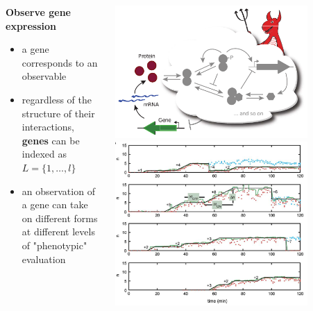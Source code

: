 \begin{frame}
\begin{columns}[c]
\begin{column}{0.5\textwidth}
\begin{block}{\textbf{Observe gene expression}}
\begin{itemize}
\item a gene corresponds to an observable
\item regardless of the structure of their interactions, \textbf{genes} can be indexed as $L = \{1, \ldots, l \}$
\item an observation of a gene can take on different forms at different levels of "phenotypic" evaluation
\end{itemize}
\end{block}
\end{column}
\begin{column}{0.5\textwidth}
\begin{center}
\includegraphics[width=0.8\textwidth]{fig/geneexpressiondemon.pdf}
\cite{Lestas2010}
\includegraphics[width=0.8\textwidth]{fig/transcriptcounts.png}
\cite{Golding2005}
\end{center}
\end{column}
\end{columns}
\end{frame}
